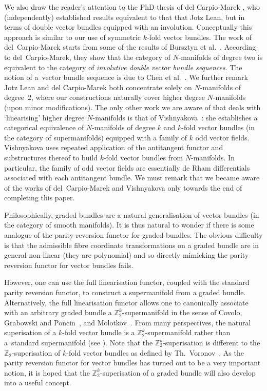 \documentclass[pdftex]{sigma}
\numberwithin{equation}{section}
\begin{document}
 We also draw the reader's attention to the PhD thesis of del Carpio-Marek \cite{Carpio-Marek:2015}, who (independently) established results equivalent to that that Jotz Lean, but in terms of double vector bundles equipped with an involution. Conceptually this approach is similar to our use of symmetric $k$-fold vector bundles. The work of del~Carpio-Marek starts from some of the results of Bursztyn et al.~\cite{Bursztyn:2015+}. According to del~Carpio-Marek, they show that the category of $N$-manifolds of degree two is equivalent to the category of \emph{involutive double vector bundle sequences}. The notion of a~vector bundle sequence is due to Chen et al.~\cite{Chen:2014}. We further remark Jotz Lean and del Carpio-Marek both concentrate solely on $N$-manifolds of degree~2, where our constructions naturally cover higher degree $N$-manifolds (upon minor modif\/ications). The only other work we are aware of that deals with `linearising' higher degree $N$-manifolds is that of Vishnyakova~\cite{Vishnyakova:2015}: she establishes a categorical equivalence of $N$-manifolds of degree $k$ and $k$-fold vector bundles (in the category of supermanifolds) equipped with a family of $k$ odd vector f\/ields. Vishnyakova uses repeated application of the antitangent functor and substructures thereof to build $k$-fold vector bundles from $N$-manifolds. In particular, the family of odd vector f\/ields are essentially de Rham dif\/ferentials associated with each antitangent bundle. We must remark that we became aware of the works of del~Carpio-Marek and Vishnyakova only towards the end of completing this paper.

Philosophically, graded bundles are a natural generalisation of vector bundles (in the category of smooth manifolds). It is thus natural to wonder if there is some analogue of the parity reversion functor for graded bundles. The obvious dif\/f\/iculty is that the admissible f\/ibre coordinate transformations on a graded bundle are in general non-linear (they are polynomial) and so directly mimicking the parity reversion functor for vector bundles fails.

However, one can use the full linearisation functor, coupled with the standard parity reversion functor, to construct a supermanifold from a graded bundle. Alternatively, the full linearisation functor allows one to canonically associate with an arbitrary graded bundle a $\mathbb{Z}_{2}^{k}$-supermanifold in the sense of Covolo, Grabowski and Poncin~\cite{Covolo:2014a,Covolo:2014b}, and Molotkov~\cite{Molotkov:2010}. From many perspectives, the natural superisation of a $k$-fold vector bundle is a $\mathbb{Z}_{2}^{k}$-supermanifold rather than a~standard supermanifold (see \cite[Proposition~6.1]{Covolo:2014a}). Note that the $\mathbb{Z}_{2}^{k}$-superisation is dif\/ferent to the $\mathbb{Z}_{2}$-superisation of $k$-fold vector bundles as def\/ined by Th.~Voronov~\cite{Voronov:2012}. As the parity reversion functor for vector bundles has turned out to be a very important notion, it is hoped that the $\mathbb{Z}_{2}^{k}$-superisation of a graded bundle will also develop into a useful concept.
\end{document}
